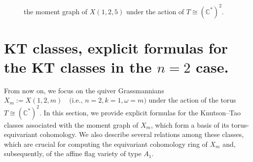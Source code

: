 \documentclass[10pt, a4paper, reqno]{amsart}
\begin{document}
\begin{exam}
\begin{minipage}{0.5\textwidth}
\begin{figure}[H]
			\caption{the moment graph of $X(1,2,5)$ under the action of $T\cong(\mathbb{C}^*)^2$.}
			\label{qrep_omega5_fig}
		\end{figure}
	\end{minipage}
\end{exam}











	\section{KT classes, explicit formulas for the KT classes in the $n=2$ case.}\label{s:kt_classes, formula}
From now on, we focus on the quiver Grassmannians
$X_m := X(1,2,m) \quad \text{(i.e., } n=2, k=1, \omega=m\text{)}$
under the action of the torus $T \cong (\mathbb{C}^*)^2$.
In this section, we provide explicit formulas for the Knutson--Tao classes associated with the moment graph of $X_m$, which form a basis of its torus-equivariant cohomology. We also describe several relations among these classes, which are crucial for computing the equivariant cohomology ring of $X_m$ and, subsequently, of the affine flag variety of type $A_1$.


	
	
\end{document}
